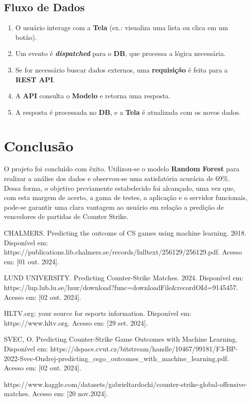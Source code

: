 \documentclass[a4paper,times,12pt]{article}
\begin{document}
\subsection{Fluxo de Dados}
\begin{enumerate}
  \item O usuário interage com a \textbf{Tela} (ex.: visualiza uma lista ou clica em um botão).
  \item Um evento é \textbf{\textit{dispatched}} para o \textbf{DB}, que processa a lógica necessária.
  \item Se for necessário buscar dados externos, uma \textbf{requisição} é feita para a \textbf{REST API}.
  \item A \textbf{API} consulta o \textbf{Modelo} e retorna uma resposta.
  \item A resposta é processada no \textbf{DB}, e a \textbf{Tela} é atualizada com os novos dados.
\end{enumerate}

\section{Conclusão}
\hspace{+15pt}
O projeto foi concluído com êxito. Utilizou-se o modelo \textbf{Random Forest} para realizar a análise dos dados e observou-se uma satisfatória acurácia de 69\%. Dessa forma, o objetivo previamente estabelecido foi alcançado, uma vez que, com esta margem de acerto, a gama de testes, a aplicação e o servidor funcionais, pode-se garantir uma clara vantagem ao usuário em relação a predição de vencedores de partidas de Counter Strike. 


\newpage
\begin{thebibliography}{00}

   CHALMERS. Predicting the outcome of CS games using machine learning. 2018. Disponível em: https://publications.lib.chalmers.se/records/fulltext/256129/256129.pdf. Acesso em: [01 out. 2024].

   LUND UNIVERSITY. Predicting Counter-Strike Matches. 2024. Disponível em: https://lup.lub.lu.se/luur/download?func=downloadFile\&recordOId=9145457. Acesso em: [02 out. 2024].

   HLTV.org: your source for esports information. Disponível em: https://www.hltv.org. Acesso em: [29 set. 2024].

   SVEC, O. Predicting Counter-Strike Game Outcomes with Machine Learning. Disponível em: https://dspace.cvut.cz/bitstream/handle/10467/99181/F3-BP-2022-Svec-Ondrej-predicting\_csgo\_outcomes\_with\_machine\_learning.pdf. Acesso em: [02 out. 2024].

   https://www.kaggle.com/datasets/gabrieltardochi/counter-strike-global-offensive-matches. Acesso em: [20 nov.2024].
\end{thebibliography}
\end{document}
